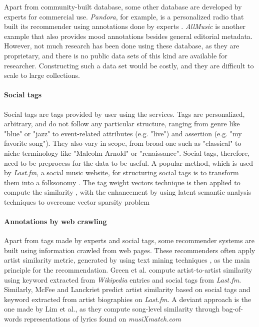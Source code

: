 Apart from community-built database, some other database are developed by experts for commercial use. \textit{Pandora}, for example, is a personalized radio that built its recommender using annotations done by experts \cite{jones2007user}. \textit{AllMusic} is another example that also provides mood annotations besides general editorial metadata. However, not much research has been done using these database, as they are proprietary, and there is no public data sets of this kind are available for researcher. Constructing such a data set would be costly, and they are difficult to scale to large collections.

\paragraph{Social tags}
Social tags are tags provided by user using the services. Tags are personalized, arbitrary, and do not follow any particular structure, ranging from genre like "blue" or "jazz" to event-related attributes (e.g. "live") and assertion (e.g. "my favorite song"). They also vary in scope, from broad one such as "classical" to niche terminology like "Malcolm Arnold" or "renaissance". Social tags, therefore, need to be preprocess for the data to be useful. A popular method, which is used by \textit{Last.fm}, a social music website, for structuring social tags is to transform them into a folksonomy \cite{sordo2008quest}. The tag weight vectors technique is then applied to compute the similarity \cite{green2009generating}, with the enhancement by using latent semantic analysis techniques to overcome vector sparsity problem \cite{levy2008learning}

\paragraph{Annotations by web crawling}
Apart from tags made by experts and social tags, some recommender systems are built using information crawled from web pages. These recommenders often apply artist similarity metric, generated by using text mining techniques \cite{schedl2011exploring}, as the main principle for the recommendation. Green et al. \cite{green2009generating} compute artist-to-artist similarity using keyword extracted from \textit{Wikipedia} entries and social tags from \textit{Last.fm}. Similarly, McFee and Lanckriet \cite{mcfee2011learning} predict artist similarity based on social tags and keyword extracted from artist biographies on \textit{Last.fm}. A deviant approach is the one made by Lim et al., as they compute song-level similarity through bag-of-words representations of lyrics found on \textit{musiXmatch.com} \cite{lim2013robust}

